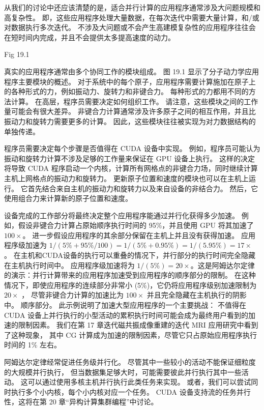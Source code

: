 从我们的讨论中还应该清楚的是，适合并行计算的应用程序通常涉及大问题规模和高复杂性。 
即，这些应用程序处理大量数据，在每次迭代中需要大量计算，和/或对数据执行多次迭代。 
不涉及大问题或不会产生高建模复杂性的应用程序往往会在短时间内完成，并且不会提供太多提高速度的动力。

{\color{red} Fig 19.1}

真实的应用程序通常由多个协同工作的模块组成。 图 19.1 显示了分子动力学应用程序主要模块的概述。 
对于系统中的每个原子，应用程序需要计算施加在原子上的各种形式的力，例如振动力、旋转力和非键合力。 
每种形式的力都用不同的方法计算。 在高层，程序员需要决定如何组织工作。 请注意，这些模块之间的工作量可能会有很大差异。 
非键合力计算通常涉及许多原子之间的相互作用，并且比振动力和旋转力需要更多的计算。 
因此，这些模块往往被实现为对力数据结构的单独传递。

程序员需要决定每个步骤是否值得在 CUDA 设备中实现。 
例如，程序员可能认为振动和旋转力计算不涉及足够的工作量来保证在 GPU 设备上执行。 
这样的决定将导致 CUDA 程序启动一个内核，计算所有网格点的非键合力场，同时继续计算主机上网格点的振动力和旋转力。 
更新原子位置和速度的模块也可以在主机上运行。 它首先结合来自主机的振动力和旋转力以及来自设备的非结合力。 
然后，它使用组合力来计算新的原子位置和速度。

设备完成的工作部分将最终决定整个应用程序能通过并行化获得多少加速。 
例如，假设非键合力计算占原始顺序执行时间的 95\%，并且使用 GPU 将其加速了 $100\times$。 
进一步假设应用程序的其余部分保留在主机上并且没有获得加速。 
应用程序级加速为 $1/(5\% + 95\%/100) = 1/(5\% + 0.95\%) = 1/(5.95\%) = 17\times$ 。 
在主机和CUDA设备的执行可以重叠的情况下，并行部分的执行时间完全隐藏在主机执行时间中。 
应用程序级加速将为 $1/(5\%) = 20\times$。这是阿姆达尔定律的演示：并行计算带来的应用程序加速受到应用程序的顺序部分的限制。 
在这种情况下，即使应用程序的连续部分非常小 (5\%)，它仍将应用程序级别加速限制为 $20\times$ ，
尽管非键合力计算的加速比为 $100\times $ 并且完全隐藏在主机执行的阴影中。 
顺序部分。 此示例说明了加速大型应用程序的一个主要挑战：
不值得在 CUDA 设备上并行执行的小型活动的累积执行时间可能会成为最终用户看到的加速的限制因素。 
我们在第 17 章迭代磁共振成像重建的迭代 MRI 应用研究中看到了这种现象，
其中 CG 计算成为加速的限制因素，尽管它只占原始应用程序执行时间的 1\% 左右。

阿姆达尔定律经常促进任务级并行化。 尽管其中一些较小的活动不能保证细粒度的大规模并行执行，
但当数据集足够大时，可能需要彼此并行执行其中一些活动。 这可以通过使用多核主机并行执行此类任务来实现。 
或者，我们可以尝试同时执行多个小内核，每个小内核对应一个任务。 
CUDA 设备支持流的任务并行性，这将在第 20 章“异构计算集群编程”中讨论。

